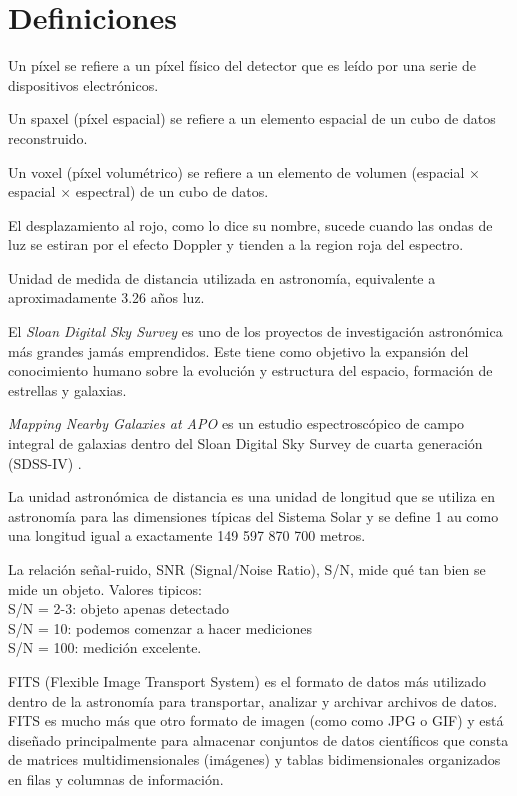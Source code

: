 \documentclass[9pt,twocolumn,a4paper]{opticajnl}
\begin{document}
\section*{Definiciones}
\begin{description}[style=nextline]
  \item[pixel] Un píxel se refiere a un píxel físico del detector que es leído por una serie de dispositivos electrónicos.
  \item[spaxel] Un spaxel (píxel espacial) se refiere a un elemento espacial de un cubo de datos reconstruido.
  \item[voxel] Un voxel (píxel volumétrico) se refiere a un elemento de volumen (espacial × espacial × espectral) de un cubo de datos. 
  \item[redshift] El desplazamiento al rojo, como lo dice su nombre, sucede cuando las ondas de luz se estiran por el efecto Doppler y tienden a la region roja del espectro.
  \item[pársec] Unidad de medida de distancia utilizada en astronomía, equivalente a aproximadamente 3.26 años luz.
  \item[SDSS] El \textit{Sloan Digital Sky Survey} es uno de los proyectos de investigación astronómica más grandes jamás emprendidos. Este tiene como objetivo la expansión del conocimiento humano sobre la evolución y estructura del espacio, formación de estrellas y galaxias.
  \item[MaNGA] \textit{Mapping Nearby Galaxies at APO} es un estudio espectroscópico de campo integral de galaxias dentro del Sloan Digital Sky Survey de cuarta generación (SDSS-IV) \cite{weijmans2015manga}.
  \item[Unidad Astronomica / au] La unidad astronómica de distancia es una unidad de longitud que se utiliza en astronomía para las dimensiones típicas del Sistema Solar y se define 1 au como una longitud igual a exactamente 149 597 870 700 metros.
  \item[S/N] La relación señal-ruido, SNR (Signal/Noise Ratio), S/N, mide qué tan bien se mide un objeto. Valores tipicos:\\
  S/N = 2-3: objeto apenas detectado\\
  S/N = 10: podemos comenzar a hacer mediciones\\
  S/N = 100: medición excelente.\\
  \item[Archivos .fits] FITS (Flexible Image Transport System) es el formato de datos más utilizado dentro de la astronomía para transportar, analizar y archivar archivos de datos. FITS es mucho más que otro formato de imagen (como como JPG o GIF) y está diseñado principalmente para almacenar conjuntos de datos científicos que consta de matrices multidimensionales (imágenes) y tablas bidimensionales organizados en filas y columnas de información.
\end{description}

\printbibliography
\end{document}
